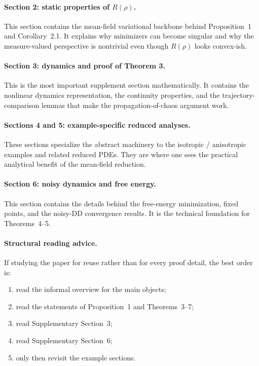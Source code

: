 \paragraph{Section 2: static properties of $R(\rho)$.}
This section contains the mean-field variational backbone behind Proposition~1 and Corollary~2.1. It explains why minimizers can become singular and why the measure-valued perspective is nontrivial even though $R(\rho)$ looks convex-ish.

\paragraph{Section 3: dynamics and proof of Theorem 3.}
This is the most important supplement section mathematically. It contains the nonlinear dynamics representation, the continuity properties, and the trajectory-comparison lemmas that make the propagation-of-chaos argument work.

\paragraph{Sections 4 and 5: example-specific reduced analyses.}
These sections specialize the abstract machinery to the isotropic / anisotropic examples and related reduced PDEs. They are where one sees the practical analytical benefit of the mean-field reduction.

\paragraph{Section 6: noisy dynamics and free energy.}
This section contains the details behind the free-energy minimization, fixed points, and the noisy-DD convergence results. It is the technical foundation for Theorems~4--5.

\paragraph{Structural reading advice.}
If studying the paper for reuse rather than for every proof detail, the best order is:
\begin{enumerate}[label=\arabic*.]
\item read the informal overview for the main objects;
\item read the statements of Proposition~1 and Theorems~3--7;
\item read Supplementary Section~3;
\item read Supplementary Section~6;
\item only then revisit the example sections.
\end{enumerate}
